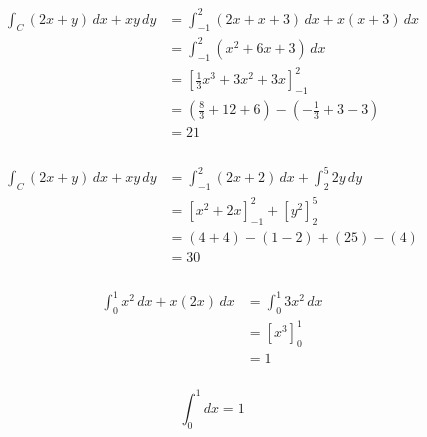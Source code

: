 \documentclass{article}
\begin{document}
\begin{align*}
  \int_C (2 x + y) \,dx + x y \,dy & = \int_{-1}^2 (2 x + x + 3) \,dx + x (x + 3) \,dx                           \\
                                   & = \int_{-1}^2 (x^2 + 6 x + 3) \,dx                                          \\
                                   & = \left[ \frac{1}{3} x^3 + 3 x^2 + 3x \right]_{-1}^2                        \\
                                   & = \left( \frac{8}{3} + 12 + 6 \right) - \left( -\frac{1}{3} + 3 - 3 \right) \\
                                   & = 21
\end{align*}

\setcounter{subsubsection}{8}
\subsubsection{}

\begin{align*}
  \int_C (2 x + y) \,dx + x y \,dy & = \int_{-1}^2 (2 x + 2) \,dx + \int_2^5 2 y \,dy \\
                                   & = [x^2 + 2 x]_{-1}^2 + [y^2]_2^5                 \\
                                   & = (4 + 4) - (1 - 2) + (25) - (4)                 \\
                                   & = 30
\end{align*}

\setcounter{subsubsection}{10}
\subsubsection{}

\begin{align*}
  \int_0^1 x^2 \,dx + x (2 x) \,dx & = \int_0^1 3 x^2 \,dx \\
                                   & = [x^3]_0^1           \\
                                   & = 1
\end{align*}

\setcounter{subsubsection}{12}
\subsubsection{}

\[\int_0^1 dx = 1\]

\setcounter{subsubsection}{18}
\end{document}
